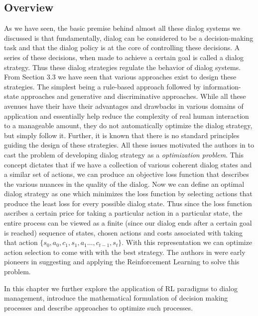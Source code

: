 \documentclass[14pt]{extarticle}
\numberwithin{equation}{section}
\begin{document}
	\subsection{Overview}
	As we have seen, the basic premise behind almost all these dialog systems we discussed is that fundamentally, dialog can be considered to be a decision-making task and that the dialog policy is at the core of controlling these decisions. A series of these decisions, when made to achieve a certain goal is called a dialog strategy. Thus these dialog strategies regulate the behavior of dialog systems. From Section 3.3 we have seen that various approaches exist to design these strategies. The simplest being a rule-based approach followed by information-state approaches and generative and discriminative approaches.  While all these avenues have their have their advantages and drawbacks in various domains of application and essentially help reduce the complexity of real human interaction to a manageable amount, they do not automatically optimize the dialog strategy, but simply follow it. Further, it is known that there is no standard principles guiding the design of these strategies. All these issues motivated the authors in \cite{Levin97astochastic} to cast the problem of developing dialog strategy as a \textit{optimization problem}. This concept dictates that if we have a collection of various coherent dialog states and a similar set of actions, we can produce an objective loss function that describes the various nuances in the quality of the dialog. Now we can define an optimal dialog strategy as one which minimizes the loss function by selecting actions that produce the least loss for every possible dialog state. Thus since the loss function ascribes a certain price for taking a particular action in a particular state, the entire process can be viewed as a finite (since our dialog ends after a certain goal is reached) sequence of states, chosen actions and costs associated with taking that action $\{s_0,a_0,c_1,s_1,a_1...,c_{t-1},s_t\}$. With this representation we can optimize action selection to come with with the best strategy. The authors in \cite{Levin97astochastic}\cite{mdp-pieraccini} were early pioneers in suggesting and applying the Reinforcement Learning to solve this problem. \par
	In this chapter we further explore the application of RL paradigms to dialog management, introduce the mathematical formulation of decision making processes and describe approaches to optimize such processes.
\end{document}
